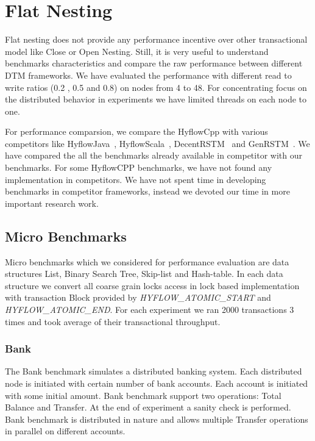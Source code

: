 \documentclass[12pt,english]{report}
\begin{document}
\section{Flat Nesting}

Flat nesting does not provide any performance incentive over other transactional model like Close or Open Nesting. Still, it is very useful to understand benchmarks characteristics and compare the raw performance between different DTM frameworks. We have evaluated the performance with different read to write ratios (0.2 , 0.5 and 0.8) on nodes from 4 to 48. For concentrating focus on the distributed behavior in experiments we have limited threads on each node to one.  

For performance comparsion, we compare the HyflowCpp with various competitors like HyflowJava~\cite{Saad:2011:HHP:1996130.1996167}, HyflowScala~\cite{turcuhyflow2}, DecentRSTM~\cite{DecentSTM:5470446} and GenRSTM~\cite{GenRSTM:6038614}. We have compared the all the benchmarks already available in competitor with our benchmarks. For some HyflowCPP benchmarks, we have not found any implementation in competitors. We have not spent time in developing benchmarks in competitor frameworks, instead we devoted our time in more important research work. 

\subsection{Micro Benchmarks}

Micro benchmarks which we considered for performance evaluation are data structures List, Binary Search Tree, Skip-list and Hash-table. In each data structure we convert all coarse grain locks access in lock based implementation with transaction Block provided by \emph{HYFLOW{\_}ATOMIC{\_}START} and \emph{HYFLOW{\_}ATOMIC{\_}END}. For each experiment we ran 2000 transactions 3 times and took average of their transactional throughput.  

\subsubsection{Bank}

The Bank benchmark simulates a distributed banking system. Each distributed node is initiated with certain number of bank accounts. Each account is initiated with some initial amount. Bank benchmark support two operations: Total Balance and Transfer. At the end of experiment a sanity check is performed. Bank benchmark is distributed in nature and allows multiple Transfer operations in parallel on different accounts.
\end{document}
